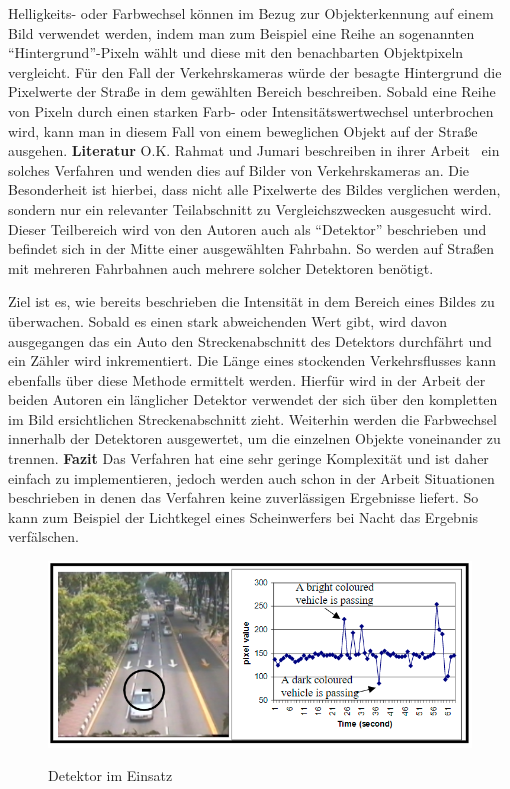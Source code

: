 Helligkeits- oder Farbwechsel können im Bezug zur Objekterkennung auf einem Bild verwendet werden, indem man zum Beispiel eine Reihe an sogenannten "`Hintergrund"'-Pixeln wählt und diese mit den benachbarten Objektpixeln vergleicht.
Für den Fall der Verkehrskameras würde der besagte Hintergrund die Pixelwerte der Straße in dem gewählten Bereich beschreiben.
Sobald eine Reihe von Pixeln durch einen starken Farb- oder Intensitätswertwechsel unterbrochen wird, kann man in diesem Fall von einem beweglichen Objekt auf der Straße ausgehen.\newline\newline
\textbf{Literatur}\newline
O.K. Rahmat und Jumari beschreiben in ihrer Arbeit~\cite{bin2001vehicle} ein solches Verfahren und wenden dies auf Bilder von Verkehrskameras an. 
Die Besonderheit ist hierbei, dass nicht alle Pixelwerte des Bildes verglichen werden, sondern nur ein relevanter Teilabschnitt zu Vergleichszwecken ausgesucht wird. 
Dieser Teilbereich wird von den Autoren auch als "`Detektor"' beschrieben und befindet sich in der Mitte einer ausgewählten Fahrbahn. 
So werden auf Straßen mit mehreren Fahrbahnen auch mehrere solcher Detektoren benötigt.

Ziel ist es, wie bereits beschrieben die Intensität in dem Bereich eines Bildes zu überwachen. 
Sobald es einen stark abweichenden Wert gibt, wird davon ausgegangen das ein Auto den Streckenabschnitt des Detektors durchfährt und ein Zähler wird inkrementiert.
Die Länge eines stockenden Verkehrsflusses kann ebenfalls über diese Methode ermittelt werden. 
Hierfür wird in der Arbeit der beiden Autoren ein länglicher Detektor verwendet der sich über den kompletten im Bild ersichtlichen Streckenabschnitt zieht.
Weiterhin werden die Farbwechsel innerhalb der Detektoren ausgewertet, um die einzelnen Objekte voneinander zu trennen.
\newline\newline
\textbf{Fazit}\newline
Das Verfahren hat eine sehr geringe Komplexität und ist daher einfach zu implementieren, jedoch werden auch schon in der Arbeit Situationen beschrieben in denen das Verfahren keine zuverlässigen Ergebnisse liefert. 
So kann zum Beispiel der Lichtkegel eines Scheinwerfers bei Nacht das Ergebnis verfälschen.
\begin{figure}[ht]
   \centering
     \includegraphics[width=15cm]{Bilder/pixelanalysis} \\
 \caption{Detektor im Einsatz}
 \label{fig:Pixelanalysis}
\end{figure}
